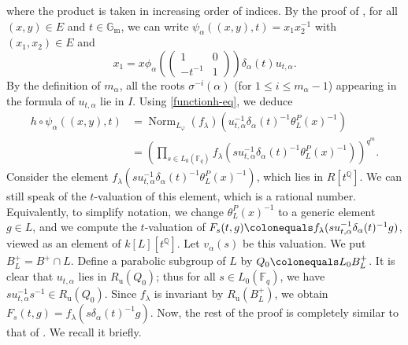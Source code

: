 \documentclass[10pt,a4paper]{article}
\numberwithin{equation}{section}
\theoremstyle{definition}
\theoremstyle{remark}
\newcommand{\FF}{\mathbb{F}}
\newcommand{\GG}{\mathbb{G}}
\newcommand{\QQ}{\mathbb{Q}}
\DeclareMathOperator{\Norm}{Norm}
\begin{document}
where the product is taken in increasing order of indices. By the proof of \cite[Proposition 3.1.4]{Imai-Koskivirta-vector-bundles}, for all $(x,y)\in E$ and $t\in \GG_{\mathrm{m}}$, we can write $\psi_\alpha((x,y),t)=x_1x_2^{-1}$ with $(x_1,x_2)\in E$ and
\begin{equation}
    x_1=x\phi_{\alpha} \left(\begin{pmatrix}
1&0\\-t^{-1}&1
\end{pmatrix} \right) \delta_{\alpha}(t) 
u_{t,\alpha}.
\end{equation}
By the definition of $m_\alpha$, all the roots $\sigma^{-i}(\alpha)$ (for $1\leq i\leq m_\alpha-1$) appearing in the formula of $u_{t,\alpha}$ lie in $I$. Using \eqref{functionh-eq}, we deduce 
\begin{align}
h\circ \psi_\alpha((x,y),t)&=\Norm_{L_\varphi}(f_\lambda)\left(u_{t,\alpha}^{-1}\delta_\alpha(t)^{-1}\theta_L^P(x)^{-1}\right) \\
&=\left(\prod_{s\in L_0(\FF_q)} f_\lambda\left(su_{t,\alpha}^{-1}\delta_\alpha(t)^{-1}\theta_L^P(x)^{-1}\right) \right)^{q^m}.
\end{align}
Consider the element $f_\lambda(su_{t,\alpha}^{-1}\delta_\alpha(t)^{-1}\theta_L^P(x)^{-1})$, which lies in $R[t^{\QQ}]$. We can still speak of the $t$-valuation of this element, which is a rational number. Equivalently, to simplify notation, we change $\theta_L^P(x)^{-1}$ to a generic element $g\in L$, and we compute the $t$-valuation of $F_s(t,g)\colonequals f_\lambda(su_{t,\alpha}^{-1}\delta_\alpha(t)^{-1}g)$, viewed as an element of $k[L][t^\QQ]$. Let $v_\alpha(s)$ be this valuation. 
We put $B^+_L=B^+ \cap L$. 
Define a parabolic subgroup of $L$ by $Q_0\colonequals L_0 B^+_L$. It is clear that $u_{t,\alpha}$ lies in $R_{\mathrm{u}}(Q_0)$; thus for all $s\in L_0(\FF_q)$, we have $su_{t,\alpha}^{-1}s^{-1}\in R_{\mathrm{u}}(Q_0)$. Since $f_\lambda$ is invariant by $R_{\mathrm{u}}(B^+_L)$, we obtain 
$F_s(t,g)=f_\lambda(s\delta_\alpha(t)^{-1}g)$. Now, the rest of the proof is completely similar to that of \cite[Theorem 3.5.3]{Koskivirta-automforms-GZip}. We recall it briefly.
\end{document}
